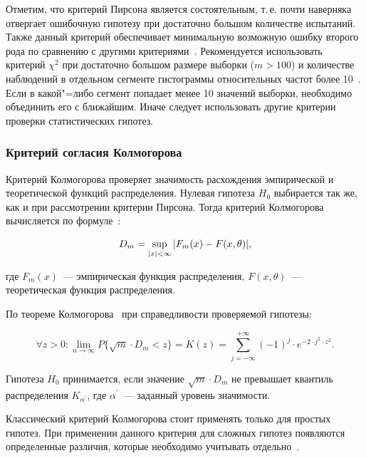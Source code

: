 \documentclass[a4paper, article, 14pt]{extarticle}
\begin{document}
Отметим, что критерий Пирсона является состоятельным, т.\,е. почти наверняка отвергает ошибочную гипотезу при достаточно большом количестве испытаний. Также данный критерий обеспечивает минимальную возможную ошибку второго рода по сравнению с другими критериями~\cite{smirnov}. Рекомендуется использовать критерий $\chi^2$ при достаточно большом размере выборки ($m > 100$) и количестве наблюдений в отдельном сегменте гистограммы относительных частот более 10~\cite{koroluk}. Если в какой"=либо сегмент попадает менее 10 значений выборки, необходимо объединить его с ближайшим. Иначе следует использовать другие критерии проверки статистических гипотез.

\subsubsection{Критерий согласия Колмогорова}\label{sec:kolmogorov_criteria}

Критерий Колмогорова проверяет значимость расхождения эмпирической и теоретической функций распределения. Нулевая гипотеза $H_0$ выбирается так же, как и при рассмотрении критерии Пирсона. Тогда критерий Колмогорова вычисляется по формуле~\cite{koroluk}:

\begin{equation}\label{eq:kolmogorov_criteria}
	D_m = \sup_{\abs*{x} < \infty}{\abs*{F_m(x) - F(x, \theta)}},
\end{equation}

\noindent где $F_m(x)$~--- эмпирическая функция распределения, $F(x, \theta)$~--- теоретическая функция распределения.

По теореме Колмогорова~\cite{koroluk} при справедливости проверяемой гипотезы:

\begin{equation}\label{eq:kolmogorov_test}
	\forall z > 0: \lim_{n \rightarrow \infty}{P\{\sqrt{m} \cdot D_m < z\}} = K(z) = \sum_{j = -\infty}^{+\infty}{(-1)^j \cdot e^{-2 \cdot j^2 \cdot z^2}}.
\end{equation}

\noindent Гипотеза $H_0$ принимается, если значение $\sqrt{m} \cdot D_m$ не превышает квантиль распределения $K_{\alpha^{'}}$, где $\alpha^{'}$~--- заданный уровень значимости.

Классический критерий Колмогорова стоит применять только для простых гипотез. При применении данного критерия для сложных гипотез появляются определенные различия, которые необходимо учитывать отдельно~\cite{kac}.
\end{document}
